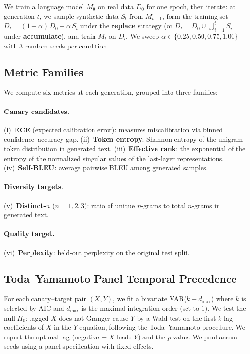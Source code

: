 \documentclass[letterpaper,11pt]{article}
\begin{document}
We train a language model $M_0$ on real data $D_0$ for one epoch, then iterate: at generation $t$, we sample synthetic data $S_t$ from $M_{t-1}$, form the training set $D_t = (1-\alpha)\,D_0 + \alpha\,S_t$ under the \textbf{replace} strategy (or $D_t = D_0 \cup \bigcup_{i=1}^{t} S_i$ under \textbf{accumulate}), and train $M_t$ on $D_t$.
We sweep $\alpha \in \{0.25, 0.50, 0.75, 1.00\}$ with 3 random seeds per condition.

\subsection{Metric Families}

We compute six metrics at each generation, grouped into three families:

\paragraph{Canary candidates.} (i)~\textbf{ECE} (expected calibration error): measures miscalibration via binned confidence--accuracy gap. (ii)~\textbf{Token entropy}: Shannon entropy of the unigram token distribution in generated text. (iii)~\textbf{Effective rank}: the exponential of the entropy of the normalized singular values of the last-layer representations. (iv)~\textbf{Self-BLEU}: average pairwise BLEU among generated samples.

\paragraph{Diversity targets.} (v)~\textbf{Distinct-$n$} ($n=1,2,3$): ratio of unique $n$-grams to total $n$-grams in generated text.

\paragraph{Quality target.} (vi)~\textbf{Perplexity}: held-out perplexity on the original test split.

\subsection{Toda--Yamamoto Panel Temporal Precedence}

For each canary--target pair $(X,Y)$, we fit a bivariate VAR($k+d_{\max}$) where $k$ is selected by AIC and $d_{\max}$ is the maximal integration order (set to 1). We test the null $H_0$: lagged $X$ does not Granger-cause $Y$ by a Wald test on the first $k$ lag coefficients of $X$ in the $Y$ equation, following the Toda--Yamamoto procedure.
We report the optimal lag (negative = $X$ leads $Y$) and the $p$-value.
We pool across seeds using a panel specification with fixed effects.
\end{document}
